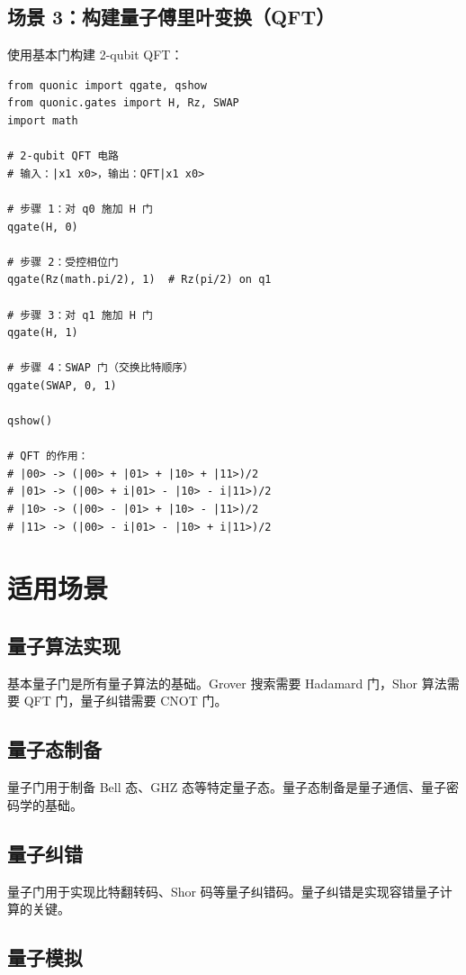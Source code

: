\documentclass[12pt,a4paper]{article}
\begin{document}
\subsection{场景 3：构建量子傅里叶变换（QFT）}

使用基本门构建 2-qubit QFT：

\begin{verbatim}
from quonic import qgate, qshow
from quonic.gates import H, Rz, SWAP
import math

# 2-qubit QFT 电路
# 输入：|x1 x0>，输出：QFT|x1 x0>

# 步骤 1：对 q0 施加 H 门
qgate(H, 0)

# 步骤 2：受控相位门
qgate(Rz(math.pi/2), 1)  # Rz(pi/2) on q1

# 步骤 3：对 q1 施加 H 门
qgate(H, 1)

# 步骤 4：SWAP 门（交换比特顺序）
qgate(SWAP, 0, 1)

qshow()

# QFT 的作用：
# |00> -> (|00> + |01> + |10> + |11>)/2
# |01> -> (|00> + i|01> - |10> - i|11>)/2
# |10> -> (|00> - |01> + |10> - |11>)/2
# |11> -> (|00> - i|01> - |10> + i|11>)/2
\end{verbatim}

\section{适用场景}

\subsection{量子算法实现}

基本量子门是所有量子算法的基础。Grover 搜索需要 Hadamard 门，Shor 算法需要 QFT 门，量子纠错需要 CNOT 门。

\subsection{量子态制备}

量子门用于制备 Bell 态、GHZ 态等特定量子态。量子态制备是量子通信、量子密码学的基础。

\subsection{量子纠错}

量子门用于实现比特翻转码、Shor 码等量子纠错码。量子纠错是实现容错量子计算的关键。

\subsection{量子模拟}
\end{document}
